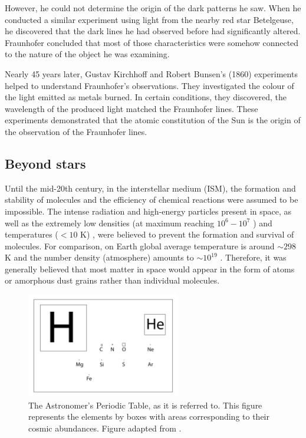 However, he could not determine the origin of the dark patterns he saw. When he conducted a similar experiment using light from the nearby red star Betelgeuse, he discovered that the dark lines he had observed before had significantly altered. Fraunhofer concluded that most of those characteristics were somehow connected to the nature of the object he was examining.

Nearly 45 years later, Gustav Kirchhoff and Robert Bunsen's \cite{kirchhoff_chemical_1860} (1860) experiments helped to understand Fraunhofer's observations. They investigated the colour of the light emitted as metals burned. In certain conditions, they discovered, the wavelength of the produced light matched the Fraunhofer lines. These experiments demonstrated that the atomic constitution of the Sun is the origin of the observation of the Fraunhofer lines. 

\subsection{Beyond stars}
Until the mid-20th century, in the interstellar medium (ISM), the formation and stability of molecules and the efficiency of chemical reactions were assumed to be impossible. The intense radiation and high-energy particles present in space, as well as the extremely low densities (at maximum reaching $10^6 - 10^7$ \percc) and temperatures ($<10$ K) \cite{harju_detection_2008}, were believed to prevent the formation and survival of molecules. For comparison, on Earth global average temperature is around $\sim 298$ K and the number density (atmosphere) amounts to $\sim 10^{19}$ \percc. Therefore, it was generally believed that most matter in space would appear in the form of atoms or amorphous dust grains rather than individual molecules.

\begin{figure}[!htb]
    \centering
    \includegraphics[width=0.6\textwidth]{figures/intro/astro-periodic-table.png}
    \caption{The Astronomer's Periodic Table, as it is referred to. This figure represents the elements by boxes with areas corresponding to their cosmic abundances. Figure adapted from \citet{mccall_optical_2005}.}
    \label{fig:astrochemistry-astro-periodic-table}
\end{figure}


